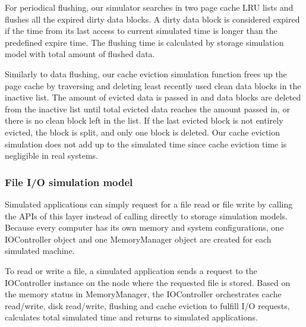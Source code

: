 \documentclass[conference]{IEEEtran}
\begin{document}
			For periodical flushing, our simulator searches in two page cache 
			LRU lists and flushes all the expired dirty data blocks. 
			A dirty data block is considered expired if the time from its last access 
			to current simulated time is longer than the predefined expire time. 
			The flushing time is calculated by storage simulation model with 
			total amount of flushed data.
				
			Similarly to data flushing, our cache eviction simulation function frees up 
			the page cache by traversing and deleting least recently used clean 
			data blocks in the inactive list.
			The amount of evicted data is passed in and data blocks are deleted 
			from the inactive list until total evicted data reaches the amount 
			passed in, or there is no clean block left in the list.
			If the last evicted block is not entirely evicted, the block is split, 
			and only one block is deleted.
			Our cache eviction simulation does not add up to the simulated time 
			since cache eviction time is negligible in real systems.			
			
			\subsubsection{File I/O simulation model}			
			
			Simulated applications can simply request for a file read 
			or file write by calling the APIs of this layer instead of 
			calling directly to storage simulation models.
			Because every computer has its own memory and system configurations, 
			one IOController object and one MemoryManager object are created 
			for each simulated machine.
			
			To read or write a file, a simulated application sends a request to the 
			IOController instance on the node where the requested file is stored.
			Based on the memory status in MemoryManager, the IOController 
			orchestrates cache read/write, disk read/write, flushing and cache eviction 
			to fulfill I/O requests, calculates total simulated time and returns to 
			simulated applications.
			
\end{document}
